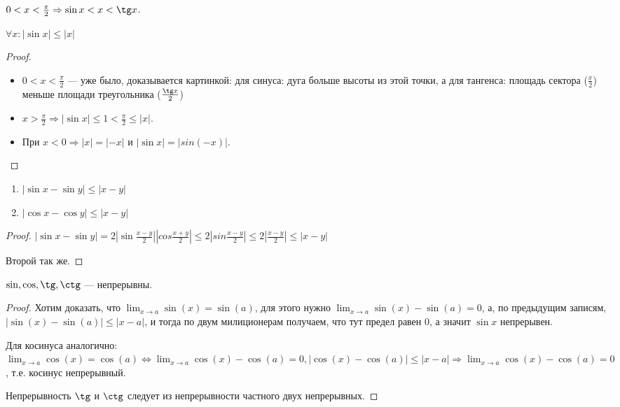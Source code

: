 \begin{theorem}
    $0 < x < \frac{\pi}{2} \Rightarrow \sin x < x < \tg x$.
\end{theorem}
\begin{consequence}
    $\forall x: |\sin x| \le |x|$
\end{consequence}
\begin{proof}
\slashn
    \begin{itemize}
	    \item $0 < x < \frac{\pi}{2}$ --- уже было, доказывается картинкой: для синуса: дуга больше высоты из этой точки, а для тангенса: площадь сектора ($\frac{x}2$) меньше площади треугольника ($\frac{\tg x}2$)
        \item $x > \frac{\pi}{2} \Rightarrow |\sin x| \le 1 < \frac{\pi}{2} \le |x|$.
        \item При $x < 0 \Rightarrow |x| = |-x|$ и  $|\sin x| = |sin(-x)|$.
    \end{itemize}
\end{proof}
\begin{consequence}
\slashn
\begin{enumerate}
    \item $|\sin x - \sin y| \le |x-y|$
    \item $|\cos x - \cos y| \le |x-y|$
\end{enumerate}
\end{consequence}
\begin{proof}
    $|\sin x - \sin y| = 2|\sin \frac{x-y}{2}||cos \frac{x+y}{2}| \le 2 |sin \frac{x-y}{2}| \le 2 |\frac{x-y}{2}| \le |x-y|$ 

    Второй так же.
\end{proof}
\begin{theorem}
    $\sin, \cos, \tg, \ctg$ --- непрерывны.
\end{theorem}
\begin{proof}
	Хотим доказать, что $\lim_{x \to a} \sin(x) = \sin(a)$, для этого нужно $\lim_{x \to a} \sin(x) - \sin(a) = 0$, а, по предыдущим записям, $|\sin(x) - \sin(a)| \le |x - a|$, и тогда по двум милиционерам получаем, что тут предел равен 0, а значит $\sin x$ непрерывен.

	Для косинуса аналогично: $\lim_{x \to a} \cos(x) = \cos(a) \iff \lim_{x \to a} \cos(x) - \cos(a) = 0, |\cos(x) - \cos(a)| \le |x - a| \Rightarrow \lim_{x \to a} \cos(x) - \cos(a) = 0$, т.е. косинус непрерывный.

	Непрерывность $\tg$ и $\ctg$ следует из непрерывности частного двух непрерывных.
\end{proof}

